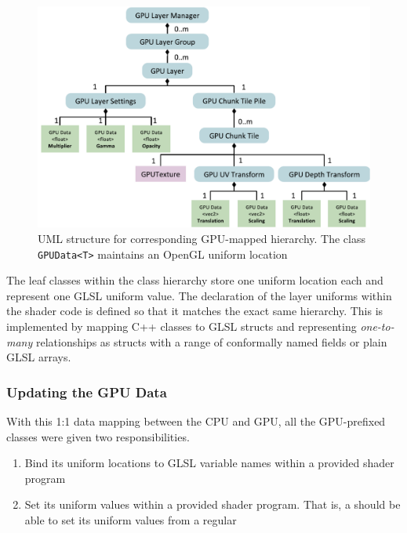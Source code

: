 \begin{figure}[htbp]
    \centering
    \includegraphics[width=\textwidth]{figures/implementation/layers/gpulayermanager.pdf}
    \caption{UML structure for corresponding GPU-mapped hierarchy. The class \texttt{GPUData<T>} maintains an OpenGL uniform location}
    \label{fig:gpulayermanager}
\end{figure}

The leaf classes within the class hierarchy store one uniform location each and represent one GLSL uniform value. The declaration of the layer uniforms within the shader code is defined so that it matches the exact same hierarchy. This is implemented by mapping C++ classes to GLSL structs and representing \emph{one-to-many} relationships as structs with a range of conformally named fields or plain GLSL arrays.

\subsubsection{Updating the GPU Data}

With this 1:1 data mapping between the CPU and GPU, all the GPU-prefixed classes were given two responsibilities.

\begin{enumerate}
\item Bind its uniform locations to GLSL variable names within a provided shader program
\item Set its uniform values within a provided shader program. That is, a  should be able to set its uniform values from a regular 
\end{enumerate}

